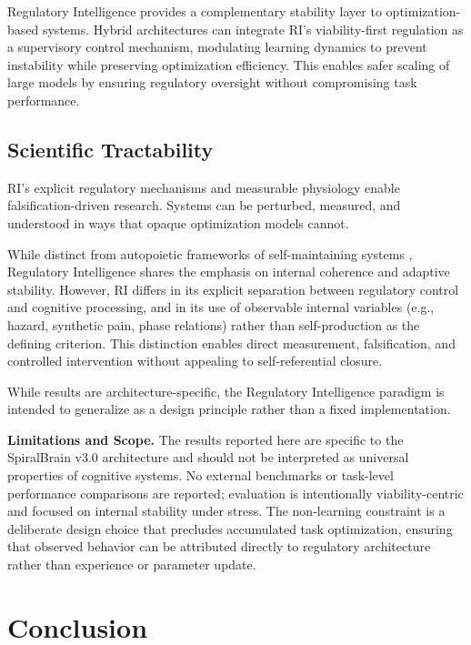 \documentclass[12pt,a4paper]{report}
\begin{document}
Regulatory Intelligence provides a complementary stability layer to optimization-based systems. Hybrid architectures can integrate RI's viability-first regulation as a supervisory control mechanism, modulating learning dynamics to prevent instability while preserving optimization efficiency. This enables safer scaling of large models by ensuring regulatory oversight without compromising task performance.

\subsection{Scientific Tractability}

RI's explicit regulatory mechanisms and measurable physiology enable falsification-driven research. Systems can be perturbed, measured, and understood in ways that opaque optimization models cannot.

While distinct from autopoietic frameworks of self-maintaining systems
\citep{maturana1972autopoiesis}, Regulatory Intelligence shares the emphasis on
internal coherence and adaptive stability. However, RI differs in its
explicit separation between regulatory control and cognitive processing,
and in its use of observable internal variables (e.g., hazard, synthetic
pain, phase relations) rather than self-production as the defining criterion.
This distinction enables direct measurement, falsification, and controlled
intervention without appealing to self-referential closure.

While results are architecture-specific, the Regulatory Intelligence paradigm is intended to generalize as a design principle rather than a fixed implementation.

\textbf{Limitations and Scope.}
The results reported here are specific to the SpiralBrain v3.0 architecture and should not be interpreted as universal properties of cognitive systems. No external benchmarks or task-level performance comparisons are reported; evaluation is intentionally viability-centric and focused on internal stability under stress. The non-learning constraint is a deliberate design choice that precludes accumulated task optimization, ensuring that observed behavior can be attributed directly to regulatory architecture rather than experience or parameter update.

\section{Conclusion}
\end{document}
